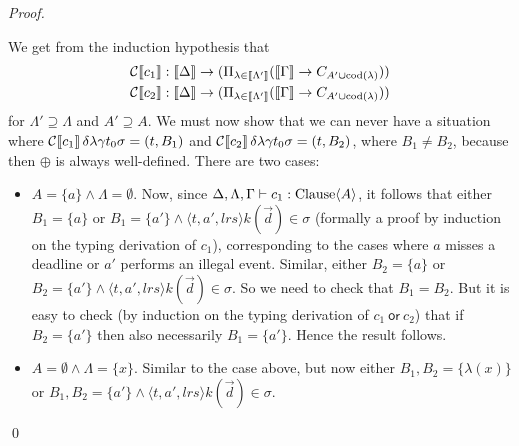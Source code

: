 \documentclass[orivec,final]{llncs-href}
\newcommand{\cod}[1]{\mathrm{cod}(#1)}
\newcommand{\dendom}[1]{\llbracket #1 \rrbracket}
\newcommand{\trace}{\sigma}
\newcommand{\choice}{\mathit{lrs}}
\newcommand{\event}[3]{\langle #1,#2,#3\rangle}
\newcommand{\cor}[2]{#1\ \mathsf{or}\ #2}
\newcommand{\cordefault}{\cor{c_1}{c_2}}
\begin{document}
\begin{proof}
\begin{itemize}[]
   We get from the induction hypothesis that
    \begin{align*}
      \cdenclause{c_1}{}{}{}{}{} &: \dendom{\Delta} \to (\Pi_{\lambda
        \in \dendom{\Lambda'}} (\dendom{\Gamma} \to C_{A' \cup
        \cod{\lambda}}))\\
      \cdenclause{c_2}{}{}{}{}{} &: \dendom{\Delta} \to (\Pi_{\lambda
        \in \dendom{\Lambda'}} (\dendom{\Gamma} \to C_{A' \cup
        \cod{\lambda}}))
   \end{align*}
   for $\Lambda' \supseteq \Lambda$ and $A' \supseteq A$. We must now
   show that we can never have a situation where
   $\cdenclause{c_1}{\delta}{\lambda}{\gamma}{t_0}{\trace} = (t,B_1)$ and
   $\cdenclause{c_2}{\delta}{\lambda}{\gamma}{t_0}{\trace} = (t,B_2)$,
   where $B_1 \neq B_2$, because then $\oplus$ is always
   well-defined. There are two cases:
   \begin{itemize}
     \item $A = \{a\} \land \Lambda = \emptyset$. Now, since
       $\Delta,\Lambda,\Gamma \vdash c_1 : \mathrm{Clause} \langle A \rangle$, it follows that
       either $B_1 = \{a\}$ or $B_1 = \{a'\} \land
       \event{t}{a'}{\choice}{k(\vec{d})} \in \trace$ (formally a
       proof by induction on the typing derivation of $c_1$),
       corresponding to the cases where $a$ misses a deadline or $a'$
       performs an illegal event. Similar,
       either $B_2 = \{a\}$ or $B_2 = \{a'\} \land
       \event{t}{a'}{\choice}{k(\vec{d})} \in \trace$. So we need to
       check that $B_1 = B_2$. But it is easy to check (by induction
       on the typing derivation of $\cordefault$) that if $B_2 =
       \{a'\}$ then also necessarily $B_1 = \{a'\}$. Hence the result
       follows.
     \item $A = \emptyset \land \Lambda = \{x\}$. Similar to the case
       above, but now either $B_1,B_2 = \{\lambda(x)\}$ or $B_1,B_2 =
       \{a'\} \land \event{t}{a'}{\choice}{k(\vec{d})} \in \trace$.
     \end{itemize}
   \end{itemize}
   \qed
\end{proof}
\end{document}
